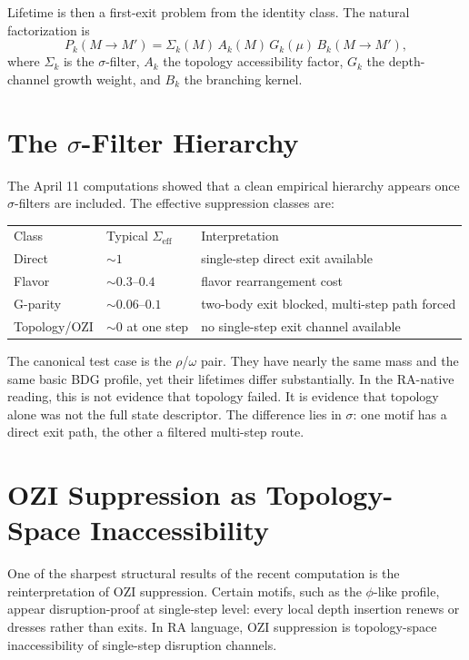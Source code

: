 \documentclass[11pt]{article}
\begin{document}
Lifetime is then a first-exit problem from the identity class. The natural factorization is
\begin{equation}
P_k(M\to M')=\Sigma_k(M)\, A_k(M)\, G_k(\mu)\, B_k(M\to M'),
\end{equation}
where $\Sigma_k$ is the $\sigma$-filter, $A_k$ the topology accessibility factor, $G_k$ the depth-channel growth weight, and $B_k$ the branching kernel.

\section{The $\sigma$-Filter Hierarchy}
The April 11 computations showed that a clean empirical hierarchy appears once $\sigma$-filters are included. The effective suppression classes are:
\begin{center}
\begin{tabular}{p{} p{} p{}}
Class & Typical $\Sigma_{\mathrm{eff}}$ & Interpretation\\
Direct & $\sim 1$ & single-step direct exit available\\
Flavor & $\sim 0.3$--$0.4$ & flavor rearrangement cost\\
G-parity & $\sim 0.06$--$0.1$ & two-body exit blocked, multi-step path forced\\
Topology/OZI & $\sim 0$ at one step & no single-step exit channel available\\
\end{tabular}
\end{center}

The canonical test case is the $\rho$/$\omega$ pair. They have nearly the same mass and the same basic BDG profile, yet their lifetimes differ substantially. In the RA-native reading, this is not evidence that topology failed. It is evidence that topology alone was not the full state descriptor. The difference lies in $\sigma$: one motif has a direct exit path, the other a filtered multi-step route.

\section{OZI Suppression as Topology-Space Inaccessibility}
One of the sharpest structural results of the recent computation is the reinterpretation of OZI suppression. Certain motifs, such as the $\phi$-like profile, appear disruption-proof at single-step level: every local depth insertion renews or dresses rather than exits. In RA language, OZI suppression is topology-space inaccessibility of single-step disruption channels.
\end{document}
